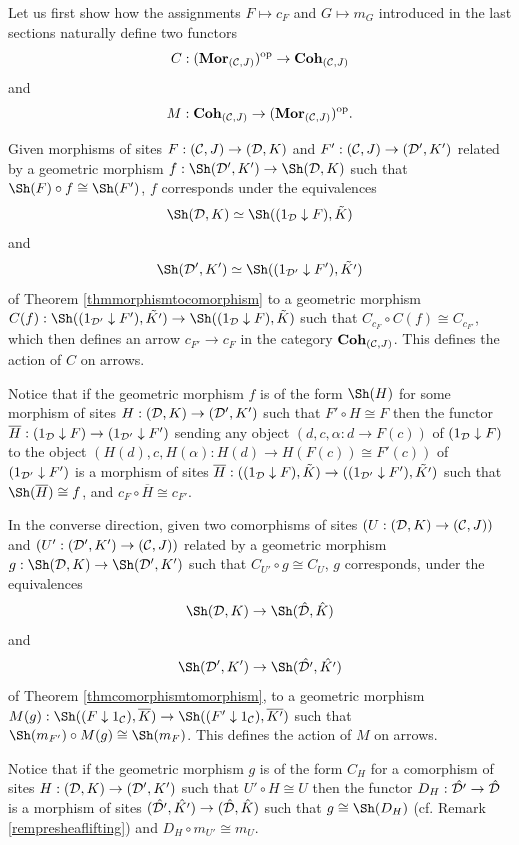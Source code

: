 \documentclass[a4paper,12pt]{article}
\begin{document}
Let us first show how the assignments $F\mapsto c_{F}$ and $G\mapsto m_{G}$ introduced in the last sections naturally define two functors
\[
C:	({\textup{\bf Mor}}_{({\cal C}, J)})^{\textup{op}} \to 	{\textup{\bf Coh}}_{({\cal C}, J)}
\] 
and
\[
M:{\textup{\bf Coh}}_{({\cal C}, J)} \to 	({\textup{\bf Mor}}_{({\cal C}, J)})^{\textup{op}}. 
\]  


Given morphisms of sites $F:({\cal C}, J)\to ({\cal D}, K)$ and $F':({\cal C}, J)\to ({\cal D}', K')$ related by a geometric morphism $f:\Sh({\cal D}', K')\to \Sh({\cal D}, K)$ such that $\Sh(F)\circ f\cong \Sh(F')$, $f$ corresponds under the equivalences
\[
\Sh({\cal D}, K)\simeq \Sh((1_{\cal D}\downarrow F), \tilde{K})
\]
and
\[
\Sh({\cal D}', K')\simeq \Sh((1_{{\cal D}'}\downarrow F'), \tilde{K'})
\]
of Theorem \ref{thmmorphismtocomorphism} to a geometric morphism $C(f):\Sh((1_{{\cal D}'}\downarrow F'), \tilde{K'}) \to \Sh((1_{\cal D}\downarrow F), \tilde{K})$ such that $C_{c_{F}}\circ C(f)\cong C_{c_{F'}}$, which then defines an arrow $c_{F'}\to c_{F}$ in the category ${\textup{\bf Coh}}_{({\cal C}, J)}$. This defines the action of $C$ on arrows.

Notice that if the geometric morphism $f$ is of the form $\Sh(H)$ for some morphism of sites $H:({\cal D}, K)\to ({\cal D}', K')$ such that $F'\circ H\cong F$ then the functor $\overline{H}:(1_{{\cal D}}\downarrow F) \to (1_{{\cal D}'}\downarrow F')$ sending any object $(d, c, \alpha:d\to F(c))$ of $(1_{{\cal D}}\downarrow F)$ to the object $(H(d), c, H(\alpha):H(d)\to H(F(c))\cong F'(c))$ of $(1_{{\cal D}'}\downarrow F')$ is a morphism of sites $\overline{H}:((1_{{\cal D}}\downarrow F), \tilde{K}) \to ((1_{{\cal D}'}\downarrow F'), \tilde{K'})$ such that $\Sh(\overline{H})\cong f$, and $c_{F}\circ \overline{H}\cong c_{F'}$.
 
In the converse direction, given two comorphisms of sites $(U:({\cal D}, K)\to ({\cal C}, J))$ and $(U':({\cal D}', K') \to ({\cal C}, J))$ related by a geometric morphism $g:\Sh({\cal D}, K)\to \Sh({\cal D}', K')$ such that $C_{U'}\circ g\cong C_{U}$, $g$ corresponds, under the equivalences
\[
\Sh({\cal D}, K) \to \Sh(\hat{{\cal D}}, \hat{{K}})
\]
and
\[
\Sh({\cal D}', K') \to \Sh(\hat{{\cal D}'}, \hat{{K'}})
\]
of Theorem \ref{thmcomorphismtomorphism}, to a geometric morphism 
$M(g):\Sh((F \downarrow 1_{\cal C}), \overline{K}) \to \Sh((F' \downarrow 1_{\cal C}), \overline{K'})$ such that $\Sh(m_{F'})\circ M(g)\cong \Sh(m_{F})$. This defines the action of $M$ on arrows. 

Notice that if the geometric morphism $g$ is of the form $C_{H}$ for a comorphism of sites $H:({\cal D}, K)\to ({\cal D}', K')$ such that $U'\circ H\cong U$ then the functor $D_{H}:\hat{{\cal D}'}\to \hat{{\cal D}}$ is a morphism of sites $(\hat{{\cal D}'}, \hat{K'})\to (\hat{{\cal D}}, \hat{K})$ such that $g\cong \Sh(D_{H})$ (cf. Remark \ref{rempresheaflifting}) and $D_{H}\circ m_{U'}\cong m_{U}$.  
\end{document}
